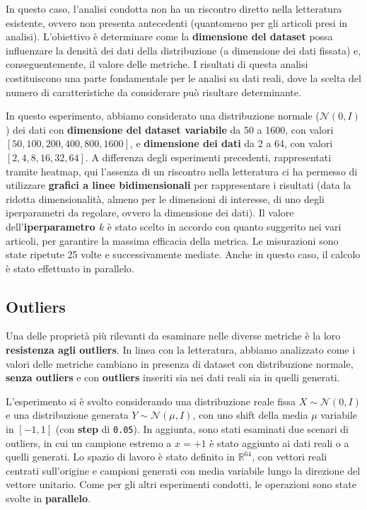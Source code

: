 In questo caso, l'analisi condotta non ha un riscontro diretto nella letteratura esistente, ovvero non presenta antecedenti (quantomeno per gli articoli presi in analisi). L'obiettivo è determinare come la \textbf{dimensione del dataset} possa influenzare la densità dei dati della distribuzione (a dimensione dei dati fissata) e, conseguentemente, il valore delle metriche. I risultati di questa analisi costituiscono una parte fondamentale per le analisi su dati reali, dove la scelta del numero di caratteristiche da considerare può risultare determinante.

In questo esperimento, abbiamo considerato una distribuzione normale (\(\mathcal{N}(0, I)\)) dei dati con \textbf{dimensione del dataset variabile} da 50 a 1600, con valori \([50, 100, 200, 400, 800, 1600]\), e \textbf{dimensione dei dati} da 2 a 64, con valori \([2, 4, 8, 16, 32, 64]\). 
A differenza degli esperimenti precedenti, rappresentati tramite heatmap, qui l'assenza di un riscontro nella letteratura ci ha permesso di utilizzare \textbf{grafici a linee bidimensionali} per rappresentare i risultati (data la ridotta dimensionalità, almeno per le dimensioni di interesse, di uno degli iperparametri da regolare, ovvero la dimensione dei dati).
Il valore dell'\textbf{iperparametro \( k \)} è stato scelto in accordo con quanto suggerito nei vari articoli, per garantire la massima efficacia della metrica. Le misurazioni sono state ripetute 25 volte e successivamente mediate. Anche in questo caso, il calcolo è stato effettuato in parallelo.

\subsection{Outliers}

Una delle proprietà più rilevanti da esaminare nelle diverse metriche è la loro \textbf{resistenza agli outliers}. In linea con la letteratura, abbiamo analizzato come i valori delle metriche cambiano in presenza di dataset con distribuzione normale, \textbf{senza outliers} e con \textbf{outliers} inseriti sia nei dati reali sia in quelli generati.

L’esperimento si è svolto considerando una distribuzione reale fissa \( X \sim \mathcal{N}(0, I) \) e una distribuzione generata \( Y \sim \mathcal{N}(\mu, I) \), con uno shift della media \(\mu\) variabile in \([-1,1]\) (con \textbf{step} di \texttt{0.05}). In aggiunta, sono stati esaminati due scenari di outliers, in cui un campione estremo a \( x = +1 \) è stato aggiunto ai dati reali o a quelli generati. 
Lo spazio di lavoro è stato definito in \( \mathbb{R}^{64} \), con vettori reali centrati sull’origine e campioni generati con media variabile lungo la direzione del vettore unitario.
Come per gli altri esperimenti condotti, le operazioni sono state svolte in \textbf{parallelo}.

